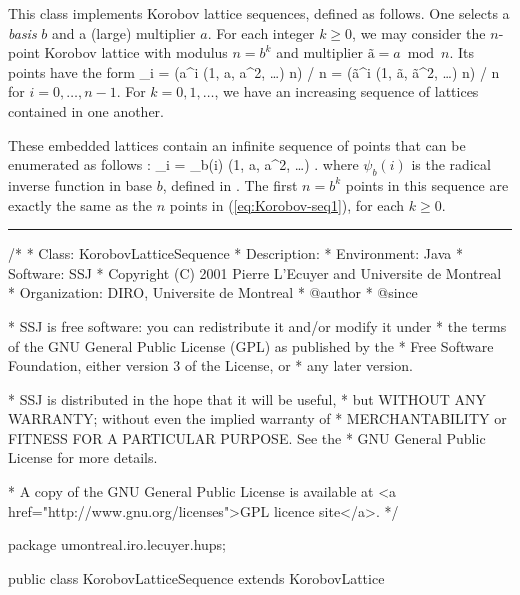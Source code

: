 

This class implements Korobov lattice sequences, defined as follows.
One selects a \emph{basis} $b$ and a (large) multiplier $a$.
For each integer $k\ge 0$, we may consider the
$n$-point Korobov lattice with modulus $n = b^k$ and multiplier
$\mbox{\~a} = a \bmod n$.
Its points have the form
\eq
 _i = (a^i (1, a, a^2, \ldots) \bmod n) / n
       = (\mbox{\~a}^i (1, \mbox{\~a}, \mbox{\~a}^2, \ldots) \bmod n) / n
\endeq
for $i=0,\dots,n-1$.
For $k = 0,1,\dots$, we have an increasing sequence of lattices
contained in one another.

These embedded lattices contain an infinite sequence of points that 
can be enumerated as follows \cite{vHIC01a}:
\eq
 _i = \psi_b(i) \left(1, a, a^2, \ldots \right) .
\endeq
where $\psi_b(i)$ is the radical inverse function in base $b$,
defined in .
The first $n=b^k$ points in this sequence are exactly the same as
the $n$ points in (\ref{eq:Korobov-seq1}), for each $k\ge 0$.

\bigskip\hrule\bigskip

\begin{code}

\begin{hide}
/*
 * Class:        KorobovLatticeSequence
 * Description:  
 * Environment:  Java
 * Software:     SSJ 
 * Copyright (C) 2001  Pierre L'Ecuyer and Universite de Montreal
 * Organization: DIRO, Universite de Montreal
 * @author       
 * @since

 * SSJ is free software: you can redistribute it and/or modify it under
 * the terms of the GNU General Public License (GPL) as published by the
 * Free Software Foundation, either version 3 of the License, or
 * any later version.

 * SSJ is distributed in the hope that it will be useful,
 * but WITHOUT ANY WARRANTY; without even the implied warranty of
 * MERCHANTABILITY or FITNESS FOR A PARTICULAR PURPOSE.  See the
 * GNU General Public License for more details.

 * A copy of the GNU General Public License is available at
   <a href="http://www.gnu.org/licenses">GPL licence site</a>.
 */
\end{hide}
package umontreal.iro.lecuyer.hups;


public class KorobovLatticeSequence extends KorobovLattice \begin{hide} { 
   int base;         // Base for radical inversion
   int inverse;      // global variables for radical inverssion,
   int n;            // since bloody JAVA cannot pass references

   // Method modPower is inherited from Rank1Lattice.
\end{hide}
\end{code}

